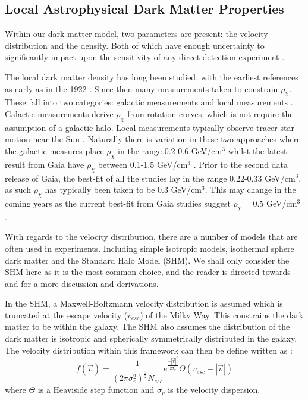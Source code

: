 \subsection{Local Astrophysical Dark Matter Properties}
\par
Within our dark matter model, two parameters are present: the velocity distribution and the density.
Both of which have enough uncertainty to significantly impact upon the sensitivity of any direct detection experiment \cite{local_dm_uncertainties_ref}.
\par
The local dark matter density has long been studied, with the earliest references as early as in the 1922 \cite{first_dm_density_1_ref, first_dm_density_2_ref}.
Since then many measurements taken to constrain $\rho_{\chi}$.
These fall into two categories: galactic measurements and local measurements \cite{dm_density_ref}.
Galactic measurements derive $\rho_{\chi}$ from rotation curves, which is not require the assumption of a galactic halo.
Local measurements typically observe tracer star motion near the Sun \cite{gaia_tracer_dm_density_ref}.
Naturally there is variation in these two approaches where the galactic measures place $\rho_{\chi}$ in the range 0.2-0.6 GeV/cm$^3$ whilst the latest result from Gaia \cite{gaia_data_2_ref} have $\rho_{\chi}$ between 0.1-1.5 GeV/cm$^3$ \cite{gaia_dm_density_2_ref}.
Prior to the second data release of Gaia, the best-fit of all the studies lay in the range 0.22-0.33 GeV/cm$^3$, as such $\rho_{\chi}$ has typically been taken to be 0.3 GeV/cm$^3$.
This may change in the coming years as the current best-fit from Gaia studies suggest $\rho_{\chi}=0.5$ GeV/cm$^{3}$ \cite{gaia_dm_density_1_ref}.
\par
With regards to the velocity distribution, there are a number of models that are often used in experiments.
Including simple isotropic models, isothermal sphere dark matter and the Standard Halo Model (SHM).
We shall only consider the SHM here as it is the most common choice, and the reader is directed towards \cite{dm_velocity_isothermal_ref} and \cite{dm_velocity_shm_ref} for a more  discussion and derivations.
\par
In the SHM, a Maxwell-Boltzmann velocity distribution is assumed which is truncated at the escape velocity ($v_{esc}$) of the Milky Way.
This constrains the dark matter to be within the galaxy.
The SHM also assumes the distribution of the dark matter is isotropic and spherically symmetrically distributed in the galaxy.
The velocity distribution within this framework can then be define written as \cite{shm_derivation_ref}:
\begin{equation}
 f(\vec{v}) = \frac{1}{(2\pi\sigma^2_{v})^{\frac{3}{2}}N_{esc}} e^{\frac{- |\vec{v}|^2}{2\sigma^2_v}} \Theta(v_{esc} - |\vec{v}|)
\label{eq:shm_velocity_1}
\end{equation}
where $\Theta$ is a Heaviside step function and $\sigma_v$ is the velocity dispersion.

